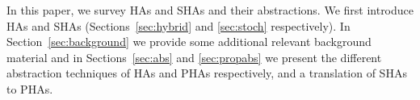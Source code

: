 In this paper, we survey HAs and SHAs and their abstractions. We first introduce HAs and SHAs (Sections~\ref{sec:hybrid} and \ref{sec:stoch} respectively). In Section~\ref{sec:background} we provide some additional relevant background material and in
Sections~\ref{sec:abs} and \ref{sec:propabs} we present the different abstraction techniques of HAs and PHAs respectively, and a translation of SHAs to PHAs. %

